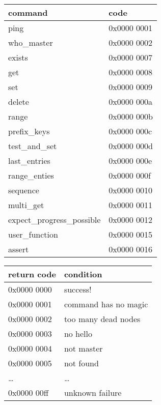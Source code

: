 \begin{table}[ht]
\begin{tabular}{|l|l|}
\hline
command & code \\
\hline
ping           & 0x0000 0001 \\
who\_master    & 0x0000 0002 \\
exists         & 0x0000 0007 \\
get            & 0x0000 0008 \\
set            & 0x0000 0009 \\
delete         & 0x0000 000a \\
range          & 0x0000 000b \\
prefix\_keys   & 0x0000 000c \\
test\_and\_set & 0x0000 000d \\
last\_entries  & 0x0000 000e \\
range\_enties  & 0x0000 000f \\
sequence       & 0x0000 0010 \\
multi\_get     & 0x0000 0011 \\
expect\_progress\_possible & 0x0000 0012 \\
user\_function & 0x0000 0015 \\
assert         & 0x0000 0016 \\
\hline
\end{tabular}
\end{table}

\begin{table}[ht]
\begin{tabular}{|l|l|}
\hline
return code & condition \\
\hline
0x0000 0000  & success!  \\
0x0000 0001  & command has no magic  \\
0x0000 0002  & too many dead nodes \\
0x0000 0003  & no hello        \\
0x0000 0004  & not master      \\
0x0000 0005  & not found       \\
\ldots       & \ldots          \\
0x0000 00ff  & unknown failure \\
\end{tabular}
\end{table}
